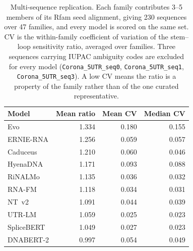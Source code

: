 \begin{table}[htbp]
\centering
\caption{Multi-sequence replication. Each family contributes 3--5 members of its Rfam seed alignment, giving 230 sequences over 47 families, and every model is scored on the same set. CV is the within-family coefficient of variation of the stem--loop sensitivity ratio, averaged over families. Three sequences carrying IUPAC ambiguity codes are excluded for every model (\texttt{Corona\_5UTR\_seq0}, \texttt{Corona\_5UTR\_seq1}, \texttt{Corona\_5UTR\_seq3}). A low CV means the ratio is a property of the family rather than of the one curated representative.}
\label{tab:multiseq}
\begin{tabular}{@{}lrrr@{}}
\toprule
\textbf{Model} & \textbf{Mean ratio} & \textbf{Mean CV} & \textbf{Median CV} \\
\midrule
Evo & 1.334 & 0.180 & 0.155 \\
ERNIE-RNA & 1.256 & 0.059 & 0.057 \\
Caduceus & 1.210 & 0.060 & 0.046 \\
HyenaDNA & 1.171 & 0.093 & 0.088 \\
RiNALMo & 1.135 & 0.036 & 0.032 \\
RNA-FM & 1.118 & 0.034 & 0.031 \\
NT~v2 & 1.091 & 0.044 & 0.039 \\
UTR-LM & 1.059 & 0.025 & 0.023 \\
SpliceBERT & 1.049 & 0.027 & 0.023 \\
DNABERT-2 & 0.997 & 0.054 & 0.049 \\
\bottomrule
\end{tabular}
\end{table}
